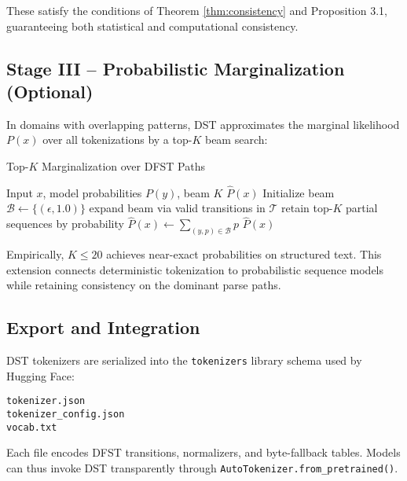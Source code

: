 These satisfy the conditions of Theorem \ref{thm:consistency}
and Proposition 3.1, guaranteeing both
statistical and computational consistency.

\subsection{Stage III – Probabilistic Marginalization (Optional)}
\label{sec:method-kbest}

In domains with overlapping patterns,
DST approximates the marginal likelihood $P(x)$
over all tokenizations by a top-$K$ beam search:

\begin{algorithm}[H]
\caption{Top-$K$ Marginalization over DFST Paths}
\label{alg:kbest}
\begin{algorithmic}[1]
\REQUIRE Input $x$, model probabilities $P(y)$, beam $K$
\ENSURE $\hat P(x)$
\STATE Initialize beam $\mathcal{B}\!\leftarrow\!\{(\epsilon,1.0)\}$
  \STATE expand beam via valid transitions in $\mathcal{T}$
  \STATE retain top-$K$ partial sequences by probability
\ENDFOR
\STATE $\hat P(x)\!\leftarrow\!\sum_{(y,p)\in\mathcal{B}}p$
\RETURN $\hat P(x)$
\end{algorithmic}
\end{algorithm}

Empirically, $K\!\le\!20$ achieves near-exact
probabilities on structured text.
This extension connects deterministic tokenization
to probabilistic sequence models while retaining consistency
on the dominant parse paths.

\subsection{Export and Integration}
\label{sec:method-export}

DST tokenizers are serialized into the
\texttt{tokenizers} library schema used by Hugging Face:

\begin{verbatim}
tokenizer.json
tokenizer_config.json
vocab.txt
\end{verbatim}

Each file encodes DFST transitions, normalizers,
and byte-fallback tables.
Models can thus invoke DST transparently through
\texttt{AutoTokenizer.from_pretrained()}.

